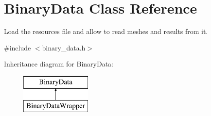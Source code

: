 \hypertarget{classBinaryData}{}\section{Binary\+Data Class Reference}
\label{classBinaryData}


Load the resources file and allow to read meshes and results from it.  




{\ttfamily \#include $<$binary\+\_\+data.\+h$>$}

Inheritance diagram for Binary\+Data\+:\begin{figure}[H]
\begin{center}
\leavevmode
\includegraphics[height=2.000000cm]{dc/d47/classBinaryData}
\end{center}
\end{figure}
